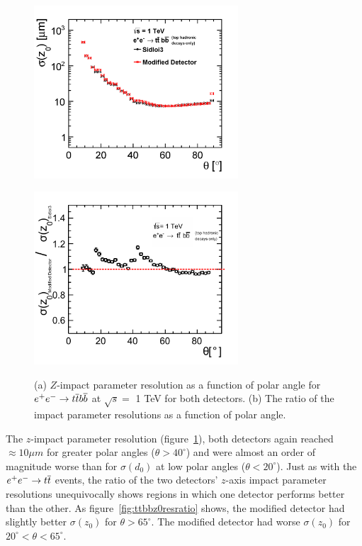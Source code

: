 \begin{figure}[h!]
\begin{minipage}{3.0in}
\centering
\includegraphics[width=3.0in]{ttbb6qallZ0ResolutionTheta_sidloi3_det_vtxbar_3doublet.png}
\label{fig:ttbbz0restwodetectors}
\end{minipage}
\begin{minipage}{3.0in}
\centering
\includegraphics[width=3.0in]{ttbb6qallZ0ResolutionThetaRatio2.pdf}
\label{fig:ttbbz0resratio}
\end{minipage}
\caption{(a) $Z$-impact parameter resolution as a function of polar angle for
$\ee \rightarrow \ttbar \bbbar$  at $\sqrt{s} = $ 1 TeV for both detectors.
(b) The ratio of the impact parameter resolutions as a function of polar angle.}
\label{fig:ttbbz0res}
\end{figure}

The $z$-impact parameter resolution (figure~\ref{fig:ttbbz0res}), both detectors again reached $\approx 10 \mu m$
for greater polar angles ($\theta > 40^{\circ}$) and were almost an order of magnitude worse than for $\sigma(d_{0})$
at low polar angles ($\theta < 20^{\circ}$).
Just as with the $\ee \rightarrow \ttbar$ events, the ratio of the two detectors' $z$-axis impact
parameter resolutions unequivocally shows regions in which one detector performs better than the other.
As figure~\ref{fig:ttbbz0resratio} shows, the modified detector had slightly better $\sigma(z_{0})$ for $\theta > 65^{\circ}$.
The modified detector had worse $\sigma(z_{0})$ for $20^{\circ} < \theta < 65^{\circ}$.

